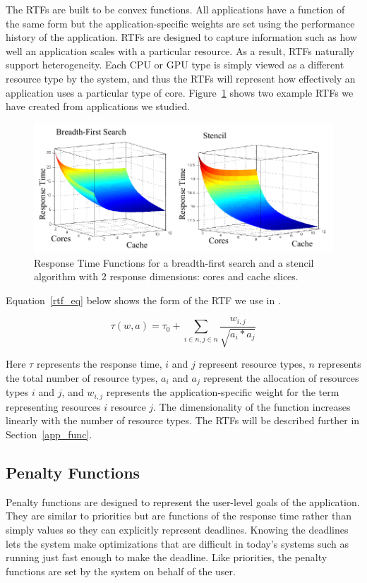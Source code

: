The RTFs are built to be convex functions.  All applications have a
function of the same form but the application-specific weights are set
using the performance history of the application.  RTFs are designed
to capture information such as how well an application scales with a
particular resource. As a result, RTFs naturally support
heterogeneity.  Each CPU or GPU type is simply viewed as a different
resource type by the system, and thus the RTFs will represent how
effectively an application uses a particular type of
core. Figure~\ref{sample_rtf} shows two example RTFs we have created
from applications we studied.

\begin{figure}[hb]
\includegraphics*[bb=0 0 426 184,width=1.0\columnwidth]{sample_rtf.pdf}
\caption{\label{sample_rtf} Response Time Functions for a breadth-first search and a stencil algorithm with 2 response dimensions: cores and cache slices.}
\end{figure}

Equation~\ref{rtf_eq} below shows the form of the RTF we use in \pacora.

\begin{equation}\label{rtf_eq}
\tau(w,a) = \tau_0 + \sum_{i\in n,j\in n}{\frac{w_{i,j}}{\sqrt{a_i * a_j}}}
\end{equation}

Here $\tau$ represents the response time, $i$ and $j$ represent resource types, $n$ represents the total number of resource types, $a_{i}$ and $a_{j}$ represent the allocation of resources types $i$ and $j$, and $w_{i,j}$ represents the application-specific weight for the term representing resources $i$ resource $j$.  The dimensionality of the function increases linearly with the number of resource types. The RTFs will be described further in Section~\ref{app_func}.

\subsection*{Penalty Functions}
Penalty functions are designed to represent the user-level goals of the application. They are similar to priorities but are functions of the response time rather than simply values so they can explicitly represent deadlines.  Knowing the deadlines lets the system make optimizations that are difficult in today's systems such as running just fast enough to make the deadline. Like priorities, the penalty functions are set by the system on behalf of the user.

